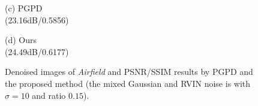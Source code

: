 \documentclass[runningheads]{llncs}
\begin{document}
\begin{figure}
{\begin{minipage}[t]{0.244\textwidth}
{\footnotesize (c) PGPD \\(23.16dB/0.5856)}
\end{minipage}
\begin{minipage}[t]{0.244\textwidth}
\centering
{}
{\footnotesize (d) Ours \\(24.49dB/0.6177)}
\end{minipage}
}
\caption{Denoised images of \textsl{Airfield} and PSNR/SSIM results by PGPD and the proposed method (the mixed Gaussian and RVIN noise is with $\sigma = 10$ and ratio $0.15$).}
\label{fig31}
\end{figure}
\end{document}
